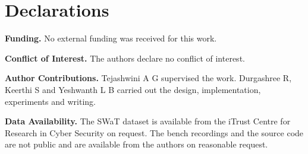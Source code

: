 \documentclass[11pt,a4paper]{article}
\begin{document}
\section*{Declarations}

\textbf{Funding.} No external funding was received for this work.

\textbf{Conflict of Interest.} The authors declare no conflict of interest.

\textbf{Author Contributions.} Tejashwini A G supervised the work. Durgashree R, Keerthi S and Yeshwanth L B carried out the design, implementation, experiments and writing.

\textbf{Data Availability.} The SWaT dataset is available from the iTrust Centre for Research in Cyber Security on request. The bench recordings and the source code are not public and are available from the authors on reasonable request.


\end{document}
